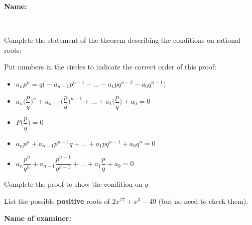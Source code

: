 \documentclass[8pt]{exam}
\newcommand\TikCircle[1][2.5]{\tikz[baseline=-#1]{\draw[thick](0,0)circle(3mm)[radius=#1mm];}}
\begin{document}
\textbf{Name:} \dotfill

\

\begin{questions}

\question[3] Complete the statement of the theorem describing the conditions on rational roots:
\vspace{-5mm}

\question[2] Put numbers in the circles to indicate the correct order of this proof:

\begin{itemize}[label=\TikCircle]
\item $ a_n p^n = q \Bigg(- a_{n-1} p^{n-1} - \ldots - a_1 pq^{n-2} - a_0 q^{n-1} \Bigg)$
\item $ a_n \bigg(\dfrac{p}{q}\bigg)^n + a_{n-1} \bigg(\dfrac{p}{q}\bigg)^{n-1} + \ldots + a_1 \bigg(\dfrac{p}{q}\bigg) + a_0 = 0$
\item $P\bigg(\dfrac{p}{q}\bigg) = 0$
\item $ a_n p^n + a_{n-1} p^{n-1}q + \ldots + a_1 pq^{n-1}+ a_0 q^n = 0$
\item $ a_n \dfrac{p^n}{q^n} + a_{n-1} \dfrac{p^{n-1}}{q^{n-1}} + \ldots + a_1 \dfrac{p}{q} + a_0 = 0$
\end{itemize}

\question[2] Complete the proof to show the condition on $q$
\fillwithdottedlines{3cm}

\question[3] List the possible \textbf{positive} roots of $2x^{17} + x^3 - 49$ (but no need to check them).
\fillwithdottedlines{2cm}


\vfill

\end{questions}

\begin{tcolorbox}

\textbf{Name of examiner:}

\begin{center}
\gradetable[h][questions]
\end{center}

\end{tcolorbox}
\end{document}
